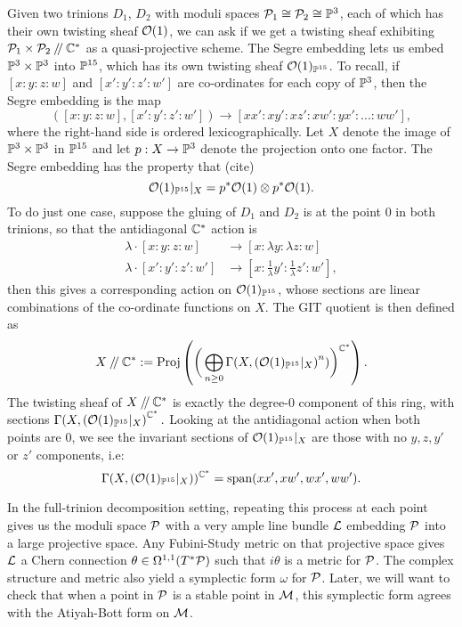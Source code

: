 	Given two trinions $D_1$, $D_2$ with moduli spaces $\mathcal{P}_1 \cong \mathcal{P}_2 \cong \mathbb{P}^3$, each of which has their own twisting sheaf $\mathcal{O}(1)$, we can ask if we get a twisting sheaf exhibiting $\mathcal{P}_1 \times \mathcal{P}_2 \mathbin{/\mkern-4mu/} \mathbb{C}^\ast$ as a quasi-projective scheme. The Segre embedding lets us embed $\mathbb{P}^3 \times \mathbb{P}^3$ into $\mathbb{P}^{15}$, which has its own twisting sheaf $\mathcal{O}(1)_{\mathbb{P}^{15}}$. To recall, if $[x:y:z:w]$ and $[x':y':z':w']$ are co-ordinates for each copy of $\mathbb{P}^3$, then the Segre embedding is the map
	\begin{equation}
		([x:y:z:w], [x':y':z':w']) \to [xx':xy':xz':xw':yx':...:ww'],
	\end{equation}
	where the right-hand side is ordered lexicographically. Let $X$ denote the image of $\mathbb{P}^3\times \mathbb{P}^3$ in $\mathbb{P}^{15}$ and let $p:X\to \mathbb{P}^3$ denote the projection onto one factor. The Segre embedding has the property that (cite)
	\begin{equation}
		\mathcal{O}(1)_{\mathbb{P}^{15}}|_X = p^\ast \mathcal{O}(1) \otimes p^\ast \mathcal{O}(1).
	\end{equation}
	To do just one case, suppose the gluing of $D_1$ and $D_2$ is at the point $0$ in both trinions, so that the antidiagonal $\mathbb{C}^\ast$ action is
	\begin{align*}
		\lambda \cdot [x:y:z:w] &\to [x:\lambda y:\lambda z: w]\\
		\lambda \cdot [x':y':z':w']&\to [x:\frac{1}{\lambda}y': \frac{1}{\lambda}z':w'],
	\end{align*}
	then this gives a corresponding action on $\mathcal{O}(1)_{\mathbb{P}^{15}}$, whose sections are linear combinations of the co-ordinate functions on $X$. The GIT quotient is then defined as
	\begin{equation}
		X\mathbin{/\mkern-4mu/} \mathbb{C}^\ast := \text{Proj}\left(\bigg(\bigoplus_{n\geq 0} \Gamma(X, \left(\mathcal{O}(1)_{\mathbb{P}^{15}}|_X\right)^n)\bigg)^{\mathbb{C}^\ast}\right).
	\end{equation}
	The twisting sheaf of $X\mathbin{/\mkern-4mu/} \mathbb{C}^\ast$ is exactly the degree-0 component of this ring, with sections $\Gamma(X, \left(\mathcal{O}(1)_{\mathbb{P}^{15}}|_X\right)^{\mathbb{C}^\ast}.$ Looking at the antidiagonal action when both points are $0$, we see the invariant sections of $\mathcal{O}(1)_{\mathbb{P}^{15}}|_X$ are those with no $y,z,y'$ or $z'$ components, i.e:
	\begin{equation}
		\Gamma(X, \left(\mathcal{O}(1)_{\mathbb{P}^{15}}|_X\right))^{\mathbb{C}^\ast} = \text{span}(xx',xw',wx',ww').
	\end{equation}
	
	In the full-trinion decomposition setting, repeating this process at each point gives us the moduli space $\mathcal{P}$ with a very ample line bundle $\mathcal{L}$ embedding $\mathcal{P}$ into a large projective space. Any Fubini-Study metric on that projective space gives $\mathcal{L}$ a Chern connection $\theta \in \Omega^{1,1}(T^\ast \mathcal{P})$ such that $i\theta$ is a metric for $\mathcal{P}$. The complex structure and metric also yield a symplectic form $\omega$ for $\mathcal{P}$. Later, we will want to check that when a point in $\mathcal{P}$ is a stable point in $\mathcal{M}$, this symplectic form agrees with the Atiyah-Bott form on $\mathcal{M}$.
